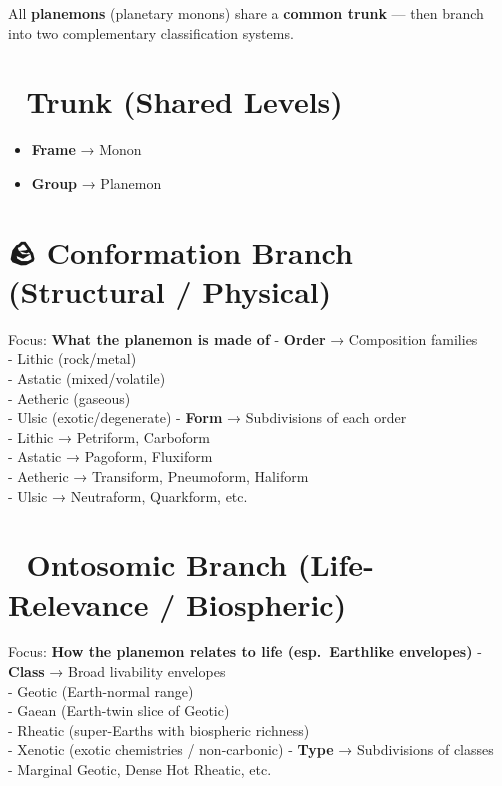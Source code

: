 \documentclass[
  letterpaper,
]{book}
\providecommand{\tightlist}{%
  \setlength{\itemsep}{0pt}\setlength{\parskip}{0pt}}
\begin{document}
All \textbf{planemons} (planetary monons) share a \textbf{common trunk}
--- then branch into two complementary classification systems.

\section{🌳 Trunk (Shared Levels)}\label{trunk-shared-levels-1}

\begin{itemize}
\tightlist
\item
  \textbf{Frame} → Monon\\
\item
  \textbf{Group} → Planemon
\end{itemize}

\section{🪨 Conformation Branch (Structural /
Physical)}\label{conformation-branch-structural-physical}

Focus: \textbf{What the planemon is made of} - \textbf{Order} →
Composition families\\
- Lithic (rock/metal)\\
- Astatic (mixed/volatile)\\
- Aetheric (gaseous)\\
- Ulsic (exotic/degenerate) - \textbf{Form} → Subdivisions of each
order\\
- Lithic → Petriform, Carboform\\
- Astatic → Pagoform, Fluxiform\\
- Aetheric → Transiform, Pneumoform, Haliform\\
- Ulsic → Neutraform, Quarkform, etc.

\section{🌱 Ontosomic Branch (Life-Relevance /
Biospheric)}\label{ontosomic-branch-life-relevance-biospheric}

Focus: \textbf{How the planemon relates to life (esp.~Earthlike
envelopes)} - \textbf{Class} → Broad livability envelopes\\
- Geotic (Earth-normal range)\\
- Gaean (Earth-twin slice of Geotic)\\
- Rheatic (super-Earths with biospheric richness)\\
- Xenotic (exotic chemistries / non-carbonic) - \textbf{Type} →
Subdivisions of classes\\
- Marginal Geotic, Dense Hot Rheatic, etc.
\end{document}

